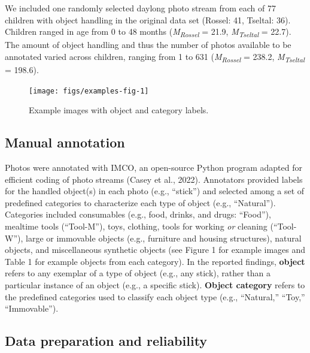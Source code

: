 \documentclass[10pt, letterpaper]{article}
\newenvironment{CodeChunk}{}{}
\begin{document}
We included one randomly selected daylong photo stream from each of 77
children with object handling in the original data set (Rossel: 41,
Tseltal: 36). Children ranged in age from 0 to 48 months
(\emph{M}\textsubscript{\emph{Rossel}} = 21.9,
\emph{M}\textsubscript{\emph{Tseltal}} = 22.7). The amount of object
handling and thus the number of photos available to be annotated varied
across children, ranging from 1 to 631
(\emph{M}\textsubscript{\emph{Rossel}} = 238.2,
\emph{M}\textsubscript{\emph{Tseltal}} = 198.6).

\begin{CodeChunk}
\begin{figure}[h]

{\centering \texttt{[image: figs/examples-fig-1]} 

}

\caption[Example images with object and category labels]{Example images with object and category labels.}\label{fig:examples-fig}
\end{figure}
\end{CodeChunk}

\hypertarget{manual-annotation}{%
\subsection{Manual annotation}\label{manual-annotation}}

Photos were annotated with IMCO, an open-source Python program adapted
for efficient coding of photo streams (Casey et al., 2022). Annotators
provided labels for the handled object(s) in each photo (e.g.,
``stick'') and selected among a set of predefined categories to
characterize each type of object (e.g., ``Natural''). Categories
included consumables (e.g., food, drinks, and drugs: ``Food''), mealtime
tools (``Tool-M''), toys, clothing, tools for working \emph{or} cleaning
(``Tool-W''), large or immovable objects (e.g., furniture and housing
structures), natural objects, and miscellaneous synthetic objects (see
Figure 1 for example images and Table 1 for example objects from each
category). In the reported findings, \textbf{object} refers to any
exemplar of a type of object (e.g., any stick), rather than a particular
instance of an object (e.g., a specific stick). \textbf{Object category}
refers to the predefined categories used to classify each object type
(e.g., ``Natural,'' ``Toy,'' ``Immovable'').

\hypertarget{data-preparation-and-reliability}{%
\subsection{Data preparation and
reliability}\label{data-preparation-and-reliability}}
\end{document}
